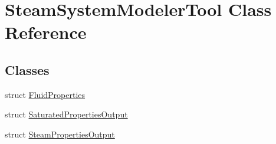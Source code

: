 \hypertarget{class_steam_system_modeler_tool}{}\section{Steam\+System\+Modeler\+Tool Class Reference}
\label{class_steam_system_modeler_tool}
\subsection*{Classes}
\begin{DoxyCompactItemize}
\item 
struct \hyperlink{struct_steam_system_modeler_tool_1_1_fluid_properties}{Fluid\+Properties}
\item 
struct \hyperlink{struct_steam_system_modeler_tool_1_1_saturated_properties_output}{Saturated\+Properties\+Output}
\item 
struct \hyperlink{struct_steam_system_modeler_tool_1_1_steam_properties_output}{Steam\+Properties\+Output}
\end{DoxyCompactItemize}
